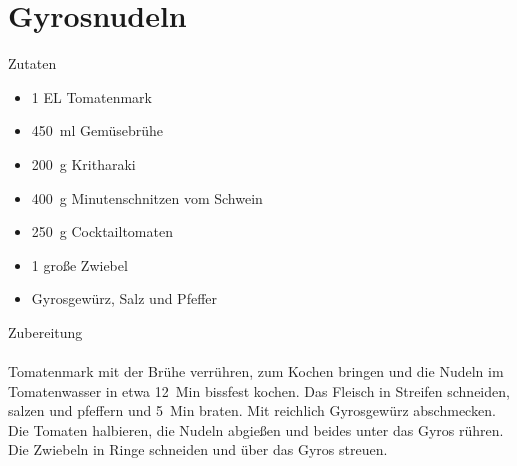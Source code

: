 \section*{Gyrosnudeln}
\ihead{}\ohead{}
\cfoot{}
{\Large Zutaten}
\begin{multicols}{2}
\begin{itemize}
    \item \num{1} EL Tomatenmark
    \item \SI{450}{ml} Gemüsebrühe
    \item \SI{200}{g} Kritharaki
    \item \SI{400}{g} Minutenschnitzen vom Schwein
    \item \SI{250}{g} Cocktailtomaten
    \item \num{1} große Zwiebel
    \item Gyrosgewürz, Salz und Pfeffer
\end{itemize}
\end{multicols}
\noindent
{\Large Zubereitung}\\
\\
Tomatenmark mit der Brühe verrühren, zum Kochen bringen und die Nudeln im Tomatenwasser in etwa \SI{12}{Min} bissfest kochen. 
Das Fleisch in Streifen schneiden, salzen und pfeffern und \SI{5}{Min} braten. 
Mit reichlich Gyrosgewürz abschmecken. 
Die Tomaten halbieren, die Nudeln abgießen und beides unter das Gyros rühren. 
Die Zwiebeln in Ringe schneiden und über das Gyros streuen. 
